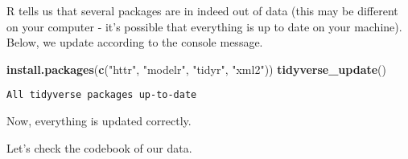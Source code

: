 \documentclass[]{article}
\newenvironment{Shaded}{\begin{snugshade}}{\end{snugshade}}
\newcommand{\KeywordTok}[1]{\textcolor[rgb]{0.13,0.29,0.53}{\textbf{#1}}}
\newcommand{\NormalTok}[1]{#1}
\newcommand{\StringTok}[1]{\textcolor[rgb]{0.31,0.60,0.02}{#1}}
\begin{document}
R tells us that several packages are in indeed out of data (this may be different on your computer - it's possible that everything is up to date on your machine). Below, we update according to the console message.

\begin{Shaded}
\begin{Highlighting}[]
\KeywordTok{install.packages}\NormalTok{(}\KeywordTok{c}\NormalTok{(}\StringTok{"httr"}\NormalTok{, }\StringTok{"modelr"}\NormalTok{, }\StringTok{"tidyr"}\NormalTok{, }\StringTok{"xml2"}\NormalTok{))}
\KeywordTok{tidyverse_update}\NormalTok{()}
\end{Highlighting}
\end{Shaded}

\begin{verbatim}
All tidyverse packages up-to-date
\end{verbatim}

Now, everything is updated correctly.

Let's check the codebook of our data.
\end{document}
